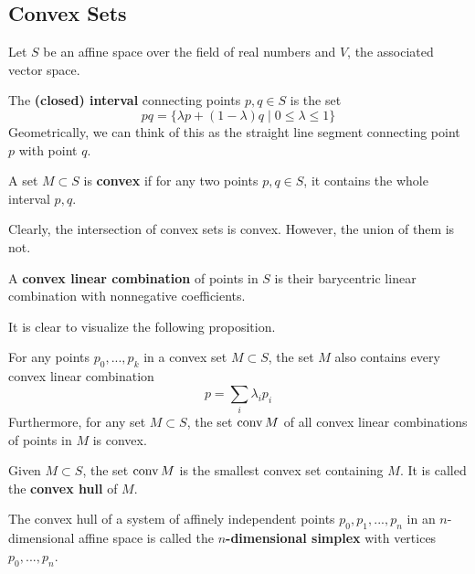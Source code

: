 \subsection{Convex Sets}

  Let $S$ be an affine space over the field of real numbers and $V$, the associated vector space. 

  \begin{definition}
    The \textbf{(closed) interval} connecting points $p, q \in S$ is the set
    \begin{equation}
      pq = \{\lambda p + (1-\lambda) q \;|\; 0 \leq \lambda \leq 1\}
    \end{equation}
    Geometrically, we can think of this as the straight line segment connecting point $p$ with point $q$. 
  \end{definition}

  \begin{definition}
    A set $M \subset S$ is \textbf{convex} if for any two points $p, q \in S$, it contains the whole interval $p, q$. 
  \end{definition}

  Clearly, the intersection of convex sets is convex. However, the union of them is not. 

  \begin{definition}
    A \textbf{convex linear combination} of points in $S$ is their barycentric linear combination with nonnegative coefficients. 
  \end{definition}

  It is clear to visualize the following proposition. 

  \begin{proposition}
    For any points $p_0, ..., p_k$ in a convex set $M \subset S$, the set $M$ also contains every convex linear combination 
    \begin{equation}
      p = \sum_i \lambda_i p_i
    \end{equation}
    Furthermore, for any set $M \subset S$, the set $\operatorname{conv}{M}$ of all convex linear combinations of points in $M$ is convex. 
  \end{proposition}

  \begin{definition}
    Given $M \subset S$, the set $\operatorname{conv} M$ is the smallest convex set containing $M$. It is called the \textbf{convex hull} of $M$. 
  \end{definition}

  \begin{definition}
    The convex hull of a system of affinely independent points $p_0, p_1, ..., p_n$ in an $n$-dimensional affine space is called the \textbf{$n$-dimensional simplex} with vertices $p_0, ..., p_n$. 
  \end{definition}

